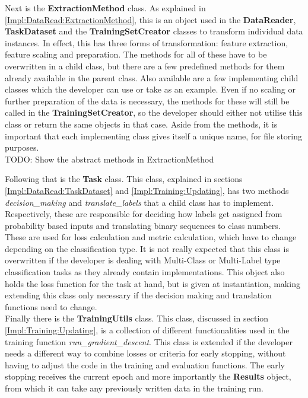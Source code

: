 Next is the \textbf{ExtractionMethod} class. As explained in \ref{Impl:DataRead:ExtractionMethod}, this is an object used in the \textbf{DataReader}, \textbf{TaskDataset} and the \textbf{TrainingSetCreator} classes to transform individual data instances. In effect, this has three forms of transformation: feature extraction, feature scaling and preparation. The methods for all of these have to be overwritten in a child class, but there are a few predefined methods for them already available in the parent class. Also available are a few implementing child classes which the developer can use or take as an example. Even if no scaling or further preparation of the data is necessary, the methods for these will still be called in the \textbf{TrainingSetCreator}, so the developer should either not utilise this class or return the same objects in that case. Aside from the methods, it is important that each implementing class gives itself a unique name, for file storing purposes.\\
TODO: Show the abstract methods in ExtractionMethod

Following that is the \textbf{Task} class. This class, explained in sections \ref{Impl:DataRead:TaskDataset} and \ref{Impl:Training:Updating}, has two methods \textit{decision\_making} and \textit{translate\_labels} that a child class has to implement. Respectively, these are responsible for deciding how labels get assigned from probability based inputs and translating binary sequences to class numbers. These are used for loss calculation and metric calculation, which have to change depending on the classification type. It is not really expected that this class is overwritten if the developer is dealing with Multi-Class or Multi-Label type classification tasks as they already contain implementations. This object also holds the loss function for the task at hand, but is given at instantiation, making extending this class only necessary if the decision making and translation functions need to change.\\

Finally there is the \textbf{TrainingUtils} class. This class, discussed in section \ref{Impl:Training:Updating}, is a collection of different functionalities used in the training function \textit{run\_gradient\_descent}. This class is extended if the developer needs a different way to combine losses or criteria for early stopping, without having to adjust the code in the training and evaluation functions. The early stopping receives the current epoch and more importantly the \textbf{Results} object, from which it can take any previously written data in the training run. \\

